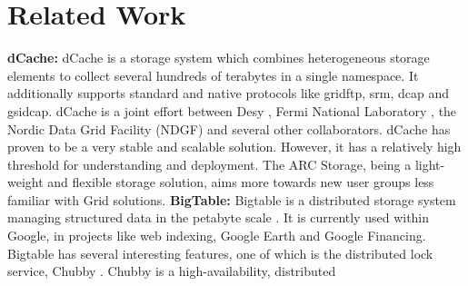 \documentclass[final]{ieee}
\begin{document}
\section{Related Work}
\label{Related Work}
\textbf{dCache:} dCache is a storage system \cite{dCache} \cite{DSSWithdCache} which combines heterogeneous storage
elements to collect several hundreds of terabytes in a single
namespace. It additionally supports standard and native
protocols like gridftp, srm, dcap and gsidcap. dCache is
a joint effort between Desy  \cite{dCachesite}, Fermi National Laboratory \cite{FermiLab}, the  Nordic Data
Grid Facility (NDGF) \cite{NDGF}  and several other collaborators. %
dCache has proven to be a very stable and scalable solution. However,
it has a relatively high threshold for understanding and
deployment. The ARC Storage, being a light-weight and flexible
storage solution, aims more towards new user groups less familiar with
Grid solutions. 
\newline
\textbf{BigTable:} Bigtable is a distributed storage system managing structured data in
the petabyte scale \cite{Bigtable}. It is currently used within
Google, in projects like web indexing, Google Earth and Google
Financing. %
Bigtable has several interesting features, one of which is the
distributed lock service, Chubby \cite{Chubby}. Chubby is a high-availability, distributed
\end{document}
